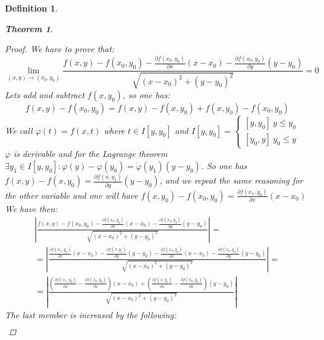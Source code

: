 \documentclass{article}
\newtheorem{theorem}{Theorem}
\newtheorem{definition}{Definition}
\begin{document}
\begin{definition}
\begin{theorem}
            \begin{proof}
                We have to prove that:
                \begin{equation*}
                    \lim_{(x,y) \to (x_0,y_0)}\frac{f(x,y) - f(x_0,y_0) - \frac{\partial f(x_0,y_0)}{\partial x}(x-x_0) - \frac{\partial f(x_0,y_0)}{\partial y}(y-y_0)}{\sqrt{(x-x_0)^2 + (y-y_0)^2}} = 0
                \end{equation*}
                Lets add and subtract $f(x,y_0)$, so one has:
                \begin{equation*}
                    f(x,y) - f(x_0,y_0) = f(x,y) - f(x,y_0) + f(x,y_0) - f(x_0,y_0)
                \end{equation*} 
                We call $\varphi (t) = f(x,t)$ where $t \in I[y,y_0]$ and $I[y,y_0] = \begin{cases}
                    [y,y_0] \ y \leq y_0 \\
                    [y_0,y] \ y_0 \leq y
                \end{cases}$ \\
                $\varphi$ is derivable and for the Lagrange theorem $\exists y_1 \in I[y,y_0] : \varphi (y) - \varphi (y_0) = \dot{\varphi}(y_1)(y-y_0)$. So one has $f(x,y) - f(x,y_0) = \frac{\partial f(x,y_1)}{\partial y}(y-y_0)$, and we repeat the same reasoning for the other variable and one will have $f(x,y_0) - f(x_0,y_0) = \frac{\partial f(x_1,y_0)}{\partial x}(x-x_0)$
                We have then: 
                    \begin{gather*}
                        \left\lvert \frac{f(x,y) - f(x_0,y_0) - \frac{\partial f(x_0,y_0)}{\partial x}(x-x_0) - \frac{\partial f(x_0,y_0)}{\partial y}(y-y_0)}{\sqrt{(x-x_0)^2 + (y-y_0)^2}} \right\rvert = \\ = \left\lvert \frac{\frac{\partial f(x_1,y_0)}{\partial x}(x-x_0) - \frac{\partial f(x,y_1)}{\partial y}{(y-y_0) - \frac{\partial f(x_0,y_0)}{\partial x}(x-x_0) - \frac{\partial f(x_0,y_0)}{\partial y}(y-y_0)}}{\sqrt{(x-x_0)^2 + (y-y_0)^2}} \right\rvert = \\ = \left\lvert \frac{\left(\frac{\partial f (x_1,y_0)}{\partial x} - \frac{\partial f (x_0,y_0)}{\partial x} \right)(x-x_0) + \left( \frac{\partial f (x,y_1)}{\partial x} - \frac{\partial f(x_0,y_0)}{\partial x}\right)(y-y_0)}{\sqrt{(x-x_0)^2 + (y-y_0)^2}}\right\rvert  
                    \end{gather*}
                The last member is increased by the following:
                    \begin{gather*}

\end{gather*}
\end{proof}
\end{theorem}
\end{definition}
\end{document}
